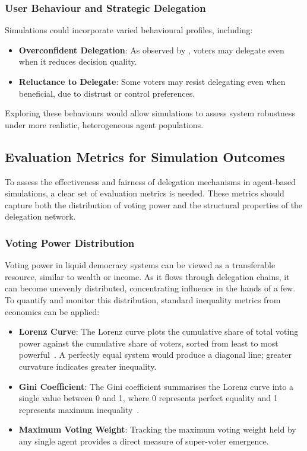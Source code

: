\subsubsection{User Behaviour and Strategic Delegation}

Simulations could incorporate varied behavioural profiles, including:

\begin{itemize}
    \item \textbf{Overconfident Delegation}: As observed by \citet{casella_2022}, voters may delegate even when it reduces decision quality.
    \item \textbf{Reluctance to Delegate}: Some voters may resist delegating even when beneficial, due to distrust or control preferences.
\end{itemize}

Exploring these behaviours would allow simulations to assess system robustness under more realistic, heterogeneous agent populations.

\subsection{Evaluation Metrics for Simulation Outcomes}

To assess the effectiveness and fairness of delegation mechanisms in agent-based simulations, a clear set of evaluation metrics is needed. These metrics should capture both the distribution of voting power and the structural properties of the delegation network.

\subsubsection{Voting Power Distribution}

Voting power in liquid democracy systems can be viewed as a transferable resource, similar to wealth or income. As it flows through delegation chains, it can become unevenly distributed, concentrating influence in the hands of a few. To quantify and monitor this distribution, standard inequality metrics from economics can be applied:

\begin{itemize}
    \item \textbf{Lorenz Curve}: The Lorenz curve plots the cumulative share of total voting power against the cumulative share of voters, sorted from least to most powerful~\citep{cowell_measuring_inequality}. A perfectly equal system would produce a diagonal line; greater curvature indicates greater inequality.
    \item \textbf{Gini Coefficient}: The Gini coefficient summarises the Lorenz curve into a single value between 0 and 1, where 0 represents perfect equality and 1 represents maximum inequality~\citep{cowell_measuring_inequality}.
    \item \textbf{Maximum Voting Weight}: Tracking the maximum voting weight held by any single agent provides a direct measure of super-voter emergence.
\end{itemize}

